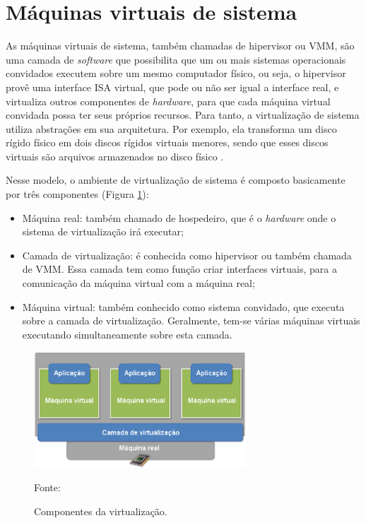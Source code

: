 \section{Máquinas virtuais de sistema}
\label{section:virtsistema}

As máquinas virtuais de sistema, também chamadas de hipervisor ou \ac{VMM}, são uma camada de \textit{software} que possibilita
que um ou mais sistemas operacionais convidados executem sobre um mesmo computador físico, ou seja, o hipervisor provê uma interface
\ac{ISA} virtual, que pode ou não ser igual a interface real, e virtualiza outros componentes de \textit{hardware}, para que cada máquina
virtual convidada possa ter seus próprios recursos. Para tanto, a virtualização de sistema utiliza abstrações em sua arquitetura. 
Por exemplo, ela transforma um disco rígido físico em dois discos rígidos virtuais menores, sendo que esses discos virtuais são arquivos 
armazenados no disco físico \cite{smithenair2005}. 

Nesse modelo, o ambiente de virtualização de sistema é composto basicamente por três componentes (Figura \ref{fig:virtcomponentes}):
\begin{itemize}
 \item Máquina real: também chamado de hospedeiro, que é o \textit{hardware} onde o sistema de virtualização irá executar;
 \item Camada de virtualização: é conhecida como hipervisor ou também chamada de \ac{VMM}. Essa camada tem como função criar interfaces 
 virtuais, para a comunicação da máquina virtual com a máquina real;
 \item Máquina virtual: também conhecido como sistema convidado, que executa sobre a camada de virtualização. Geralmente, tem-se
 várias máquinas virtuais executando simultaneamente sobre esta camada.
\end{itemize}

\begin{figure}[h!]
 \centering
 \includegraphics[width=300px]{img/virtcomponentes.eps}
 \caption{Componentes da virtualização.}
 \label{fig:virtcomponentes}
 Fonte: \citet{andrade2011}
\end{figure}

